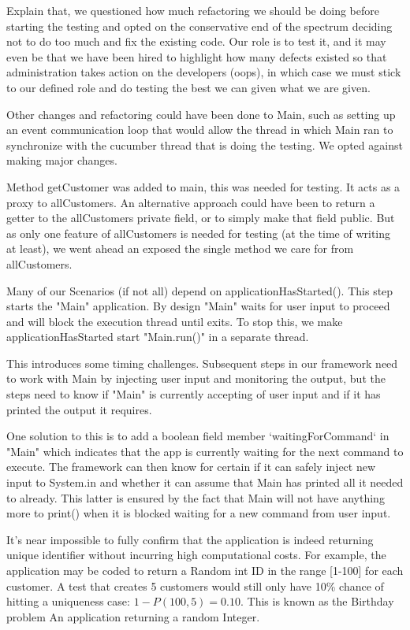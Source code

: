 \documentclass[11pt]{article}
\begin{document}
Explain that, we questioned how much refactoring we should be doing before starting the testing and opted on the conservative end of the spectrum deciding not to do too much and fix the existing code. Our role is to test it, and it may even be that we have been hired to highlight how many defects existed so that administration takes action on the developers (oops), in which case we must stick to our defined role and do testing the best we can given what we are given. 

Other changes and refactoring could have been done to Main, such as setting up an event communication loop that would allow the thread in which Main ran to synchronize with the cucumber thread that is doing the testing. We opted against making major changes. 

Method getCustomer was added to main, this was needed for testing. It acts as a proxy to allCustomers. An alternative approach could have been to return a getter to the allCustomers private field, or to simply make that field public. But as only one feature of allCustomers is needed for testing (at the time of writing at least), we went ahead an exposed the single method we care for from allCustomers. 

Many of our Scenarios (if not all) depend on applicationHasStarted(). This step starts the "Main" application. By design "Main" waits for user input to proceed and will block the execution thread until exits. To stop this, we make applicationHasStarted start "Main.run()" in a separate thread. 

This introduces some timing challenges. Subsequent steps in our framework need to work with Main by injecting user input and monitoring the output, but the steps need to know if "Main" is currently accepting of user input and if it has printed the output it requires. 

One solution to this is to add a boolean field member `waitingForCommand` in "Main" which indicates that the app is currently waiting for the next command to execute. The framework can then know for certain if it can safely inject new input to System.in and whether it can assume that Main has printed all it needed to already. This latter is ensured by the fact that Main will not have anything more to print() when it is blocked waiting for a new command from user input. 

It's near impossible to fully confirm that the application is indeed returning unique identifier without incurring high computational costs. For example, the application may be coded to return a Random int ID in the range [1-100] for each customer. A test that creates 5 customers would still only have 10\% chance of hitting a uniqueness case: 
$1 - P(100,5) = 0.10$. This is known as the Birthday problem %
An application returning a random Integer. 
\end{document}
